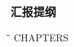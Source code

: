 %
%

\begin{frame}
  \frametitle{汇报提纲}
  \vskip0.05cm
  {\footnotesize
  \begin{tabbing}
  \hspace{0.55cm}\=\hspace{0.80cm}\=\hspace{8cm}\kill
  {{CHAPTERS}}
  \end{tabbing}
  }
\end{frame}
